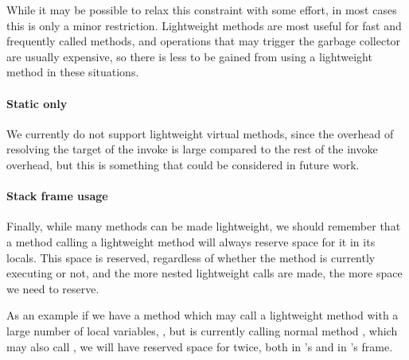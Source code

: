 While it may be possible to relax this constraint with some effort, in most cases this is only a minor restriction. Lightweight methods are most useful for fast and frequently called methods, and operations that may trigger the garbage collector are usually expensive, so there is less to be gained from using a lightweight method in these situations.

\paragraph{Static only}
We currently do not support lightweight virtual methods, since the overhead of resolving the target of the invoke is large compared to the rest of the invoke overhead, but this is something that could be considered in future work.

\paragraph{Stack frame usage}
Finally, while many methods can be made lightweight, we should remember that a method calling a lightweight method will always reserve space for it in its locals. This space is reserved, regardless of whether the method is currently executing or not, and the more nested lightweight calls are made, the more space we need to reserve.

As an example if we have a method  which may call a lightweight method with a large number of local variables, , but is currently calling normal method , which may also call , we will have reserved space for  twice, both in 's and in 's frame.

